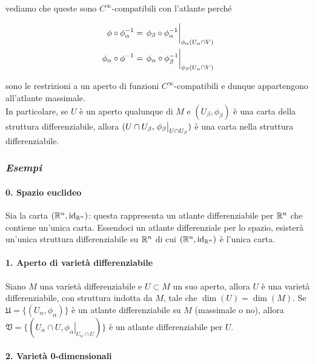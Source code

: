 vediamo che queste sono $ C^{\infty} $-compatibili con l'atlante perché

\begin{align}
	\phi \circ \phi_{\alpha}^{-1} = \eval{\phi_{\beta} \circ \phi_{\alpha}^{-1}}_{\phi_{\alpha}(U_{\alpha} \cap V)}\\
	\phi_{\alpha} \circ \phi^{-1} = \eval{\phi_{\alpha} \circ \phi_{\beta}^{-1}}_{\phi_{\beta}(U_{\alpha} \cap V)}
\end{align}

sono le restrizioni a un aperto di funzioni $ C^{\infty} $-compatibili e dunque appartengono all'atlante massimale.\\
In particolare, se $ U $ è un aperto qualunque di $ M $ e $ (U_{\beta},\phi_{\beta}) $ è una carta della struttura differenziabile, allora $ (U \cap U_{\beta}, \eval{\phi_{\beta}}_{U \cap U_{\beta}}) $ è una carta nella struttura differenziabile.

\subsubsection{\textit{Esempi}}

\paragraph{0. Spazio euclideo}

Sia la carta $ (\mathbb{R}^{n},\operatorname{id}_{\mathbb{R}^{n}}) $: questa rappresenta un atlante differenziabile per $ \mathbb{R}^{n} $ che contiene un'unica carta. Essendoci un atlante differenziale per lo spazio, esisterà un'unica struttura differenziabile su $ \mathbb{R}^{n} $ di cui $ (\mathbb{R}^{n},\operatorname{id}_{\mathbb{R}^{n}}) $ è l'unica carta.

\paragraph{1. Aperto di varietà differenziabile}

Siano $ M $ una varietà differenziabile e $ U \subset M $ un suo aperto, allora $ U $ è una varietà differenziabile, con struttura indotta da $ M $, tale che $ \dim (U) = \dim (M) $. Se $ \mathfrak{U} = \{(U_{\alpha},\phi_{\alpha})\} $ è un atlante differenziabile su $ M $ (massimale o no), allora $ \mathfrak{V} = \{(U_{\alpha} \cap U,\left. \phi_{\alpha} \right|_{U_{\alpha} \cap U})\} $ è un atlante differenziabile per $ U $.

\paragraph{2. Varietà 0-dimensionali}

